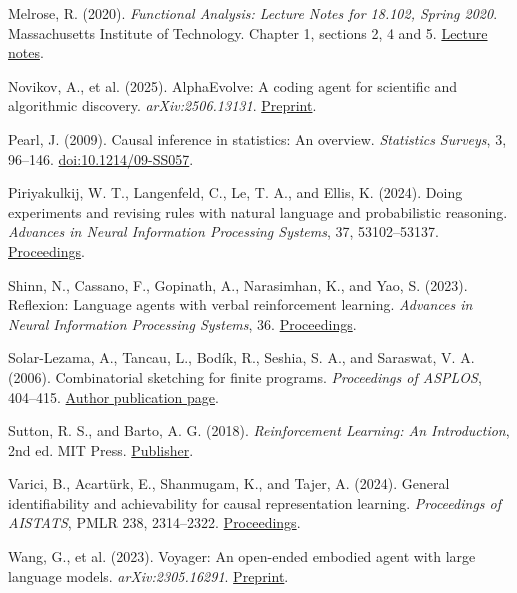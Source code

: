 \documentclass[twoside,11pt]{article}
\begin{document}
Melrose, R. (2020). \emph{Functional Analysis: Lecture Notes for 18.102, Spring 2020}. Massachusetts Institute of Technology. Chapter 1, sections 2, 4 and 5. \href{https://ocw.mit.edu/courses/18-102-introduction-to-functional-analysis-spring-2021/3d4cc88026d44a01f936cd6a0aa995cb_MIT18_102s20_lec_FA.pdf}{Lecture notes}.


Novikov, A., et al. (2025). AlphaEvolve: A coding agent for scientific and algorithmic discovery. \emph{arXiv:2506.13131}. \href{https://arxiv.org/abs/2506.13131}{Preprint}.


Pearl, J. (2009). Causal inference in statistics: An overview. \emph{Statistics Surveys}, 3, 96–146. \href{https://doi.org/10.1214/09-SS057}{doi:10.1214/09-SS057}.


Piriyakulkij, W. T., Langenfeld, C., Le, T. A., and Ellis, K. (2024). Doing experiments and revising rules with natural language and probabilistic reasoning. \emph{Advances in Neural Information Processing Systems}, 37, 53102–53137. \href{https://papers.nips.cc/paper_files/paper/2024/hash/5f1b350fc0c2affd56f465faa36be343-Abstract-Conference.html}{Proceedings}.


Shinn, N., Cassano, F., Gopinath, A., Narasimhan, K., and Yao, S. (2023). Reflexion: Language agents with verbal reinforcement learning. \emph{Advances in Neural Information Processing Systems}, 36. \href{https://proceedings.neurips.cc/paper_files/paper/2023/hash/1b44b878bb782e6954cd888628510e90-Abstract-Conference.html}{Proceedings}.


Solar-Lezama, A., Tancau, L., Bodík, R., Seshia, S. A., and Saraswat, V. A. (2006). Combinatorial sketching for finite programs. \emph{Proceedings of ASPLOS}, 404–415. \href{https://people.eecs.berkeley.edu/~sseshia/pubs/b2hd-solar-asplos06.html}{Author publication page}.


Sutton, R. S., and Barto, A. G. (2018). \emph{Reinforcement Learning: An Introduction}, 2nd ed. MIT Press. \href{https://mitpress.mit.edu/9780262039246/reinforcement-learning/}{Publisher}.


Varici, B., Acartürk, E., Shanmugam, K., and Tajer, A. (2024). General identifiability and achievability for causal representation learning. \emph{Proceedings of AISTATS}, PMLR 238, 2314–2322. \href{https://proceedings.mlr.press/v238/varici24a.html}{Proceedings}.


Wang, G., et al. (2023). Voyager: An open-ended embodied agent with large language models. \emph{arXiv:2305.16291}. \href{https://arxiv.org/abs/2305.16291}{Preprint}.
\end{document}
